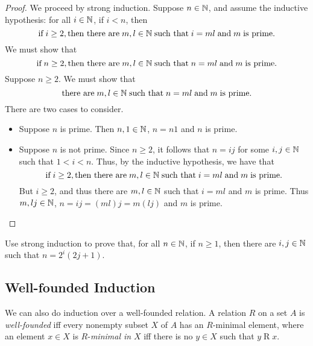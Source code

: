 \begin{proof}
We proceed by strong induction.  Suppose $n\in\mathbb{N}$, and assume the
inductive hypothesis: for all $i\in\mathbb{N}$, if $i<n$, then
\begin{displaymath}
\allowbreak\mbox{if}\allowbreak\;i\geq 2,
\allowbreak\mbox{then there are}\allowbreak\;m,l\in\mathbb{N}\;\allowbreak\mbox{such that}\allowbreak\;i=ml\;\allowbreak\mbox{and}\allowbreak\;m
\;\allowbreak\mbox{is prime.}\allowbreak
\end{displaymath}
We must show that
\begin{displaymath}
\allowbreak\mbox{if}\allowbreak\;n\geq 2,
\allowbreak\mbox{then there are}\allowbreak\;m,l\in\mathbb{N}\;\allowbreak\mbox{such that}\allowbreak\;n=ml\;\allowbreak\mbox{and}\allowbreak\;m
\;\allowbreak\mbox{is prime.}\allowbreak
\end{displaymath}
Suppose $n\geq 2$.  We must show that
\begin{displaymath}
\allowbreak\mbox{there are}\allowbreak\;m,l\in\mathbb{N}\;\allowbreak\mbox{such that}\allowbreak\;n=ml\;\allowbreak\mbox{and}\allowbreak\;m
\;\allowbreak\mbox{is prime.}\allowbreak
\end{displaymath}
There are two cases to consider.
\begin{itemize}
\item Suppose $n$ is prime.  Then $n,1\in\mathbb{N}$, $n=n1$ and $n$ is prime.

\item Suppose $n$ is not prime.  Since $n\geq 2$, it follows that $n=ij$ for
some $i,j\in\mathbb{N}$ such that $1<i<n$.  Thus, by the inductive
hypothesis, we have that
\begin{displaymath}
\allowbreak\mbox{if}\allowbreak\;i\geq 2,
\allowbreak\mbox{then there are}\allowbreak\;m,l\in\mathbb{N}\;\allowbreak\mbox{such that}\allowbreak\;i=ml\;\allowbreak\mbox{and}\allowbreak\;m
\;\allowbreak\mbox{is prime.}\allowbreak
\end{displaymath}
But $i\geq 2$, and thus there are $m,l\in\mathbb{N}$ such that
$i=ml$ and $m$ is prime.
Thus $m,lj\in\mathbb{N}$, $n=ij=(ml)j=m(lj)$ and $m$ is prime.
\end{itemize}
\end{proof}

\begin{exercise}
Use strong induction to prove that, for all $n\in\mathbb{N}$, if
$n\geq 1$, then there are $i,j\in\mathbb{N}$ such that $n=2^i(2j + 1)$.
\end{exercise}

\subsection{Well-founded Induction}

We can also do induction over a well-founded relation.  A relation $R$
on a set $A$ is \emph{well-founded} iff every nonempty subset $X$ of
%
%
$A$ has an $R$-minimal element, where an element $x\in X$ is
$R$-\emph{minimal in} $X$ iff
%
%
there is no $y\in X$ such that $y\mathrel{R}x$.

